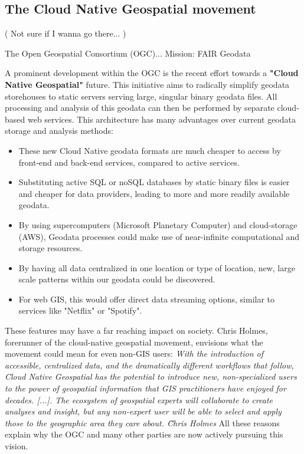 
\subsection*{The Cloud Native Geospatial movement}

( Not sure if I wanna go there... )

The Open Geospatial Consortium (OGC)...
Mission: FAIR Geodata 

A prominent development within the OGC is the recent effort towards a \textbf{"Cloud Native Geospatial"} future. 
This initiative aims to radically simplify geodata storehouses to static servers serving large, singular binary geodata files. All processing and analysis of this geodata can then be performed by separate cloud-based web services. 
This architecture has many advantages over current geodata storage and analysis methods:
\begin{itemize}
  \item These new Cloud Native geodata formats are much cheaper to access by front-end and back-end services, compared to active services.
  \item Substituting active SQL or noSQL databases by static binary files is easier and cheaper for data providers, leading to more and more readily available geodata.
  \item By using supercomputers (Microsoft Planetary Computer) and cloud-storage (AWS), Geodata processes could make use of near-infinite computational and storage resources. 
  \item By having all data centralized in one location or type of location, new, large scale patterns within our geodata could be discovered.  
  \item For web GIS, this would offer direct data streaming options, similar to services like "Netflix" or "Spotify".  
\end{itemize}

These features may have a far reaching impact on society. Chris Holmes, forerunner of the cloud-native geospatial movement, envisions what the movement could mean for even non-GIS users: 
\emph{
  With the introduction of accessible, centralized data, and the dramatically different workflows that follow, Cloud Native Geospatial has the potential to introduce new, non-specialized users to the power of geospatial information that GIS practitioners have enjoyed for decades. [...]. The ecosystem of geospatial experts will collaborate to create analyses and insight, but any non-expert user will be able to select and apply those to the geographic area they care about. \~ Chris Holmes
}
All these reasons explain why the OGC and many other parties are now actively pursuing this vision.

